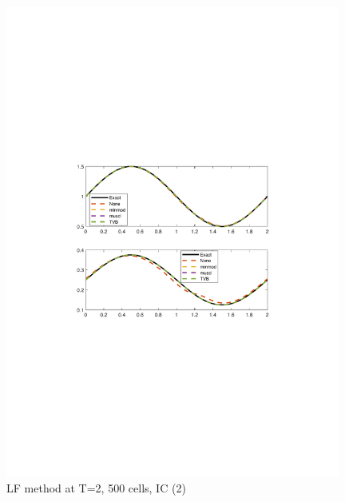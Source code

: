 \documentclass[11pt,a4paper]{article}
\begin{document}
\begin{figure}[!htb]
    \centering
    \includegraphics[width=11cm]{2_1_b_Roe.pdf}
    \caption{LF method at T=2, 500 cells, IC (2)}
    \label{fig:Roe_IC_1}
\end{figure}
\end{document}
